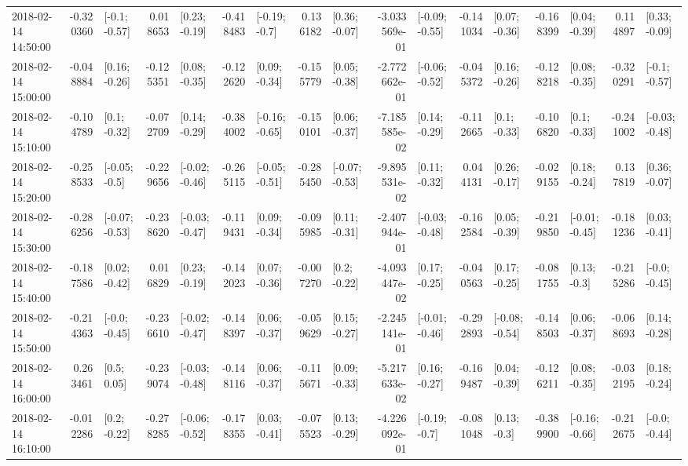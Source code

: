 \begin{tabular}{lrlrlrlrlrlrlrlrl}
2018-02-14 14:50:00 & -0.320360 &   [-0.1; -0.57] &  0.018653 &   [0.23; -0.19] & -0.418483 &   [-0.19; -0.7] &  0.136182 &   [0.36; -0.07] & -3.033569e-01 &  [-0.09; -0.55] & -0.141034 &   [0.07; -0.36] & -0.168399 &   [0.04; -0.39] &  0.114897 &   [0.33; -0.09] \\
2018-02-14 15:00:00 & -0.048884 &   [0.16; -0.26] & -0.125351 &   [0.08; -0.35] & -0.122620 &   [0.09; -0.34] & -0.155779 &   [0.05; -0.38] & -2.772662e-01 &  [-0.06; -0.52] & -0.045372 &   [0.16; -0.26] & -0.128218 &   [0.08; -0.35] & -0.320291 &   [-0.1; -0.57] \\
2018-02-14 15:10:00 & -0.104789 &    [0.1; -0.32] & -0.072709 &   [0.14; -0.29] & -0.384002 &  [-0.16; -0.65] & -0.150101 &   [0.06; -0.37] & -7.185585e-02 &   [0.14; -0.29] & -0.112665 &    [0.1; -0.33] & -0.106820 &    [0.1; -0.33] & -0.241002 &  [-0.03; -0.48] \\
2018-02-14 15:20:00 & -0.258533 &   [-0.05; -0.5] & -0.229656 &  [-0.02; -0.46] & -0.265115 &  [-0.05; -0.51] & -0.285450 &  [-0.07; -0.53] & -9.895531e-02 &   [0.11; -0.32] &  0.044131 &   [0.26; -0.17] & -0.029155 &   [0.18; -0.24] &  0.137819 &   [0.36; -0.07] \\
2018-02-14 15:30:00 & -0.286256 &  [-0.07; -0.53] & -0.238620 &  [-0.03; -0.47] & -0.119431 &   [0.09; -0.34] & -0.095985 &   [0.11; -0.31] & -2.407944e-01 &  [-0.03; -0.48] & -0.162584 &   [0.05; -0.39] & -0.219850 &  [-0.01; -0.45] & -0.181236 &   [0.03; -0.41] \\
2018-02-14 15:40:00 & -0.187586 &   [0.02; -0.42] &  0.016829 &   [0.23; -0.19] & -0.142023 &   [0.07; -0.36] & -0.007270 &    [0.2; -0.22] & -4.093447e-02 &   [0.17; -0.25] & -0.040563 &   [0.17; -0.25] & -0.081755 &    [0.13; -0.3] & -0.215286 &   [-0.0; -0.45] \\
2018-02-14 15:50:00 & -0.214363 &   [-0.0; -0.45] & -0.236610 &  [-0.02; -0.47] & -0.148397 &   [0.06; -0.37] & -0.059629 &   [0.15; -0.27] & -2.245141e-01 &  [-0.01; -0.46] & -0.292893 &  [-0.08; -0.54] & -0.148503 &   [0.06; -0.37] & -0.068693 &   [0.14; -0.28] \\
2018-02-14 16:00:00 &  0.263461 &     [0.5; 0.05] & -0.239074 &  [-0.03; -0.48] & -0.148116 &   [0.06; -0.37] & -0.115671 &   [0.09; -0.33] & -5.217633e-02 &   [0.16; -0.27] & -0.169487 &   [0.04; -0.39] & -0.126211 &   [0.08; -0.35] & -0.032195 &   [0.18; -0.24] \\
2018-02-14 16:10:00 & -0.012286 &    [0.2; -0.22] & -0.278285 &  [-0.06; -0.52] & -0.178355 &   [0.03; -0.41] & -0.075523 &   [0.13; -0.29] & -4.226092e-01 &   [-0.19; -0.7] & -0.081048 &    [0.13; -0.3] & -0.389900 &  [-0.16; -0.66] & -0.212675 &   [-0.0; -0.44] \\

\end{tabular}
